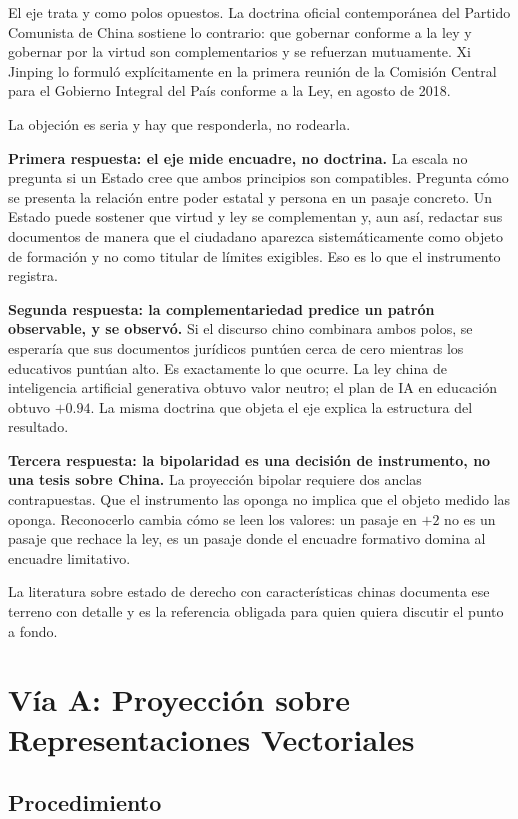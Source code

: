 El eje trata \dezhi y \fa como polos opuestos. La doctrina oficial contemporánea del Partido Comunista de China sostiene lo contrario: que gobernar conforme a la ley y gobernar por la virtud son complementarios y se refuerzan mutuamente. Xi Jinping lo formuló explícitamente en la primera reunión de la Comisión Central para el Gobierno Integral del País conforme a la Ley, en agosto de 2018.

La objeción es seria y hay que responderla, no rodearla.

\textbf{Primera respuesta: el eje mide encuadre, no doctrina.} La escala no pregunta si un Estado cree que ambos principios son compatibles. Pregunta cómo se presenta la relación entre poder estatal y persona en un pasaje concreto. Un Estado puede sostener que virtud y ley se complementan y, aun así, redactar sus documentos de manera que el ciudadano aparezca sistemáticamente como objeto de formación y no como titular de límites exigibles. Eso es lo que el instrumento registra.

\textbf{Segunda respuesta: la complementariedad predice un patrón observable, y se observó.} Si el discurso chino combinara ambos polos, se esperaría que sus documentos jurídicos puntúen cerca de cero mientras los educativos puntúan alto. Es exactamente lo que ocurre. La ley china de inteligencia artificial generativa obtuvo valor neutro; el plan de IA en educación obtuvo $+0.94$. La misma doctrina que objeta el eje explica la estructura del resultado.

\textbf{Tercera respuesta: la bipolaridad es una decisión de instrumento, no una tesis sobre China.} La proyección bipolar requiere dos anclas contrapuestas. Que el instrumento las oponga no implica que el objeto medido las oponga. Reconocerlo cambia cómo se leen los valores: un pasaje en $+2$ no es un pasaje que rechace la ley, es un pasaje donde el encuadre formativo domina al encuadre limitativo.

La literatura sobre estado de derecho con características chinas documenta ese terreno con detalle y es la referencia obligada para quien quiera discutir el punto a fondo.

\section{Vía A: Proyección sobre Representaciones Vectoriales}

\subsection{Procedimiento}

